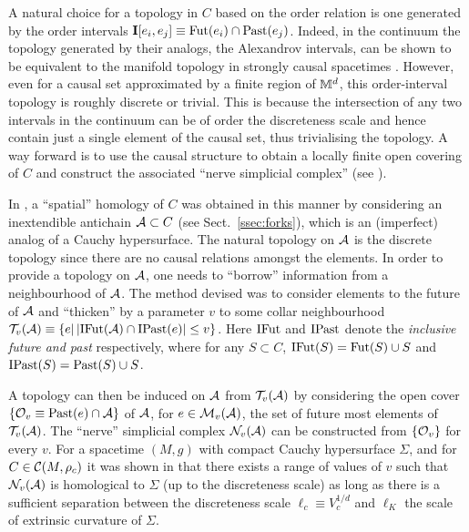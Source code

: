  A natural  choice for a topology in $C$ based on the order relation  is one generated by the order
intervals  $\mathbf I[e_i,e_j] \equiv \mathrm{Fut}(e_i) \cap \mathrm{Past}(e_j)$. Indeed, in the continuum the topology generated by their
analogs, the Alexandrov intervals,  can be shown to be  equivalent to the manifold topology  in strongly causal
spacetimes \citep{penrose}.   However, even for a causal set approximated by
 a finite region of $\mathbb M^d$,  this order-interval topology is roughly discrete or
 trivial.  This is because the intersection of any two intervals in the continuum can be  of order the discreteness scale
and hence  contain  just  a  single element of the causal set, thus trivialising the topology.  
A way forward is to use the causal structure to obtain a locally finite open covering of $C$ and construct the
  associated  ``nerve simplicial complex'' (see \citealt{munkres}). 

In \cite{homology,stablehomology},  a ``spatial'' homology of $C$ was obtained in this manner by considering an inextendible 
 antichain $\mathcal A \subset C$ (see Sect.~\ref{ssec:forks}),    which is an (imperfect) analog of a Cauchy hypersurface.
 The natural topology on $\mathcal A$ is the discrete topology since
there are no causal relations amongst the elements. In order to
provide a topology on $\mathcal A$, one needs to ``borrow'' information from a neighbourhood of
$\mathcal A$. The method devised was to consider
elements to the future of $\mathcal A$ and ``thicken'' by a parameter $v$  to some collar
neighbourhood  $\mathcal T_v(\mathcal A) \equiv\{e | \, |\mathrm{IFut}(\mathcal A)\cap \mathrm{IPast}(e)| \leq v \}$. Here $\mathrm{IFut}$ and $\mathrm{IPast}$ denote the \emph{inclusive future and
  past} respectively, where for any $S \subset C$, $\mathrm{IFut}(S)=\mathrm{Fut}(S) \cup S$ and  $\mathrm{IPast}(S)=\mathrm{Past}(S) \cup S$.



A topology can then be induced on $\mathcal A$ from $\mathcal T_v(\mathcal A)$ by considering the open cover $\{\mathcal O_v \equiv\mathrm{Past}(e) \cap
\mathcal A\}$ of $\mathcal A$, for  $e \in {\mathcal M}_v(\mathcal A)$, the  set of future most elements of  $\mathcal T_v(\mathcal A)$.  The 
``nerve''  simplicial complex $\mathcal N_v(\mathcal A)$ can be constructed 
from $\{\mathcal O_v\}$ for  every $v$.   For a spacetime $(M,g)$  with compact Cauchy hypersurface $\Sigma$, and for  $C \in \mathcal C(M,\rho_c)$ 
it was shown in \cite{homology,stablehomology}  that there exists a range of
values of  $v$ such that  $\mathcal N_v(\mathcal A)$ is  homological to $\Sigma$ (up to the discreteness scale)  as long as there is a sufficient
separation  between the discreteness  scale $\ell_c\equiv V_c^{{1}/{d}}$ and $\ell_K$ the scale of extrinsic curvature of
$\Sigma$.  

